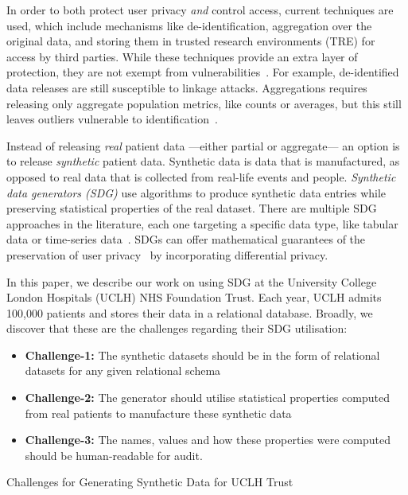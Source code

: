 \documentclass[11pt]{article}
\begin{document}
In order to both protect user privacy \emph{and} control access, current techniques are used, which include mechanisms like de-identification, aggregation over the original data, and storing them in trusted research environments (TRE) for access by third parties. While these techniques provide an extra layer of protection, they are not exempt from vulnerabilities~\cite{near2021}. For example, de-identified data releases are still susceptible to linkage attacks. Aggregations requires releasing only aggregate population metrics, like counts or averages, but this still leaves outliers vulnerable to identification~\cite{tucker2020}. 

Instead of releasing \emph{real} patient data ---either partial or aggregate--- an option is to release \emph{synthetic} patient data. Synthetic data is data that is manufactured, as opposed to real data that is collected from real-life events and people. 
\emph{Synthetic data generators (SDG)} use algorithms to produce synthetic data entries while preserving statistical properties of the real dataset.
There are multiple SDG approaches in the literature, each one targeting a specific data type, like tabular data or time-series data~\cite{DBLP:journals/corr/abs-2205-03257}.
SDGs can offer mathematical guarantees of the preservation of user privacy~\cite{Kopp2021MicrosoftSD, Cai2023} by incorporating differential privacy.


In this paper, we describe our work on using SDG at the University College London Hospitals (UCLH) NHS Foundation Trust.
Each year, UCLH admits 100,000 patients and stores their data in a relational database. Broadly, we discover that these are the challenges regarding their SDG utilisation:

\begin{listing}
\begin{itemize}
    \item \textbf{Challenge-1:} The synthetic datasets should be in the form of relational datasets for any given relational schema
    \item \textbf{Challenge-2:} The generator should utilise statistical properties computed from real patients to manufacture these synthetic data
    \item \textbf{Challenge-3:} The names, values and how these properties were computed should be human-readable for audit. 
\end{itemize}
\caption{Challenges for Generating Synthetic Data for UCLH Trust}
\label{lst:UCLH Requirements}
\end{listing}
\end{document}
